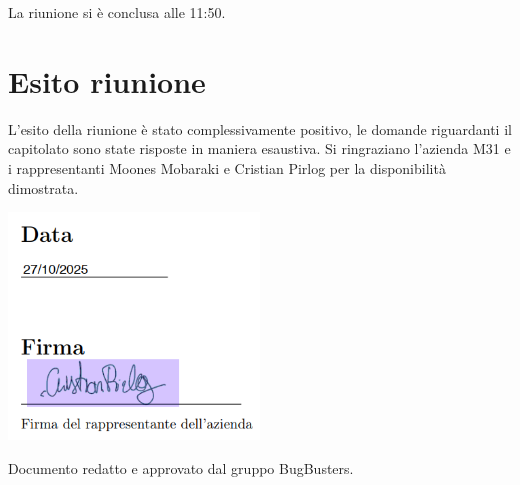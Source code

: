 \documentclass[a4paper,12pt]{article}
\begin{document}
La riunione si è conclusa alle 11:50.


\section{Esito riunione}
    L'esito della riunione è stato complessivamente positivo, le domande riguardanti il capitolato sono state risposte in maniera esaustiva. Si ringraziano l'azienda M31 e i rappresentanti Moones Mobaraki e Cristian Pirlog per la disponibilità dimostrata.
    

\vspace{1.0cm}
\noindent
\includegraphics[width=0.5\textwidth]{Data e firma.png}

\vfill
\begin{center}
    {\small\color{darkgray} Documento redatto e approvato dal gruppo BugBusters.}
\end{center}
\end{document}
